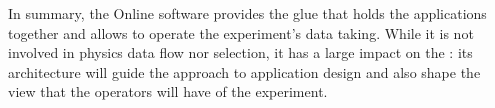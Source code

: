 In summary, the Online software provides the glue that holds the
 applications together and allows to operate the
experiment’s data taking.
While it is not involved in physics data flow nor selection, it has a
large impact on the : its architecture will guide the
approach to  application design and also shape the view
that the operators will have of the experiment.

